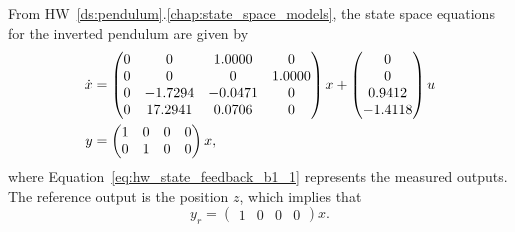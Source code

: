 
From HW~\ref{ds:pendulum}.\ref{chap:state_space_models}, the state space equations for the inverted pendulum are given by
\begin{align}
\dot{x} &= \begin{pmatrix}
       0 &        0 &   1.0000 &        0 \\
       0 &        0 &        0 &   1.0000 \\
       0 &  -1.7294 &   -0.0471 &        0 \\
       0 &  17.2941 &   0.0706 &        0 \\
\end{pmatrix} x + \begin{pmatrix}
     0 \\
     0 \\
0.9412 \\
-1.4118 \\
\end{pmatrix} u \notag \\
y &= \begin{pmatrix}
1 & 0 & 0 & 0 \\
0 & 1 & 0 & 0 
\end{pmatrix} x, \label{eq:hw_state_feedback_b1_1}
\end{align}
where Equation~\eqref{eq:hw_state_feedback_b1_1} represents the measured outputs.  The reference output is the position $z$, which implies that
\[
y_r = \begin{pmatrix} 1 & 0 & 0 & 0 \end{pmatrix} x.
\]
